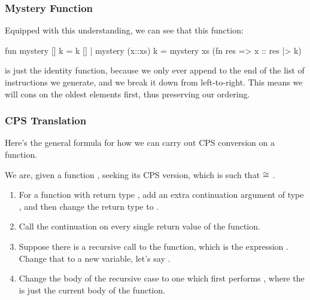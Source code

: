 \documentclass[aspectratio=169, handout]{beamer}
\begin{document}
\begin{frame}[fragile]
  \frametitle{Mystery Function}

  Equipped with this understanding, we can see that this function:
  \begin{codeblock}
    fun mystery [] k      = k []
      | mystery (x::xs) k = mystery xs (fn res => x :: res |> k)
  \end{codeblock}

  \pause
  \vspace{\fill}

  is just the identity function, because we only ever append to the end
  of the list of instructions we generate, and we break it down from
  left-to-right. This means we will cons on the oldest elements first,
  thus preserving our ordering.

  \pause
  \vspace{\fill}


\end{frame}





\begin{frame}[fragile]
  \frametitle{CPS Translation}

  Here's the general formula for how we can carry out CPS conversion on a function.

  \pause
  \vspace{\fill}

  We are, given a function , seeking its CPS version, which is
   such that  $\cong$ .

  \pause
  \vspace{\fill}

  \begin{enumerate}
    \item For a function with return type , add an extra continuation argument
    of type , and then change the return type to . \pause
    \item Call the continuation on every single return value of the function. \pause
    \item Suppose there is a recursive call to the function, which is the expression
    . Change that to a new variable, let's say . \pause
    \item Change the body of the recursive case to one which first performs
    , where the  is just the current
    body of the function.
  \end{enumerate}
\end{frame}
\end{document}
